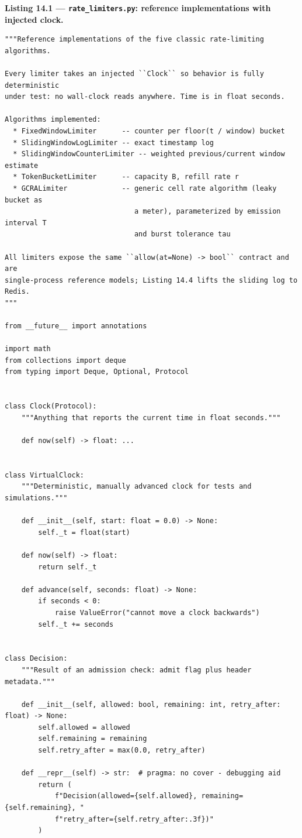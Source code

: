 \noindent\textbf{Listing 14.1 --- \texttt{rate\_limiters.py}: reference
implementations with injected clock.}
\label{lst:ch14-limiters}
\begin{verbatim}
"""Reference implementations of the five classic rate-limiting algorithms.

Every limiter takes an injected ``Clock`` so behavior is fully deterministic
under test: no wall-clock reads anywhere. Time is in float seconds.

Algorithms implemented:
  * FixedWindowLimiter      -- counter per floor(t / window) bucket
  * SlidingWindowLogLimiter -- exact timestamp log
  * SlidingWindowCounterLimiter -- weighted previous/current window estimate
  * TokenBucketLimiter      -- capacity B, refill rate r
  * GCRALimiter             -- generic cell rate algorithm (leaky bucket as
                               a meter), parameterized by emission interval T
                               and burst tolerance tau

All limiters expose the same ``allow(at=None) -> bool`` contract and are
single-process reference models; Listing 14.4 lifts the sliding log to Redis.
"""

from __future__ import annotations

import math
from collections import deque
from typing import Deque, Optional, Protocol


class Clock(Protocol):
    """Anything that reports the current time in float seconds."""

    def now(self) -> float: ...


class VirtualClock:
    """Deterministic, manually advanced clock for tests and simulations."""

    def __init__(self, start: float = 0.0) -> None:
        self._t = float(start)

    def now(self) -> float:
        return self._t

    def advance(self, seconds: float) -> None:
        if seconds < 0:
            raise ValueError("cannot move a clock backwards")
        self._t += seconds


class Decision:
    """Result of an admission check: admit flag plus header metadata."""

    def __init__(self, allowed: bool, remaining: int, retry_after: float) -> None:
        self.allowed = allowed
        self.remaining = remaining
        self.retry_after = max(0.0, retry_after)

    def __repr__(self) -> str:  # pragma: no cover - debugging aid
        return (
            f"Decision(allowed={self.allowed}, remaining={self.remaining}, "
            f"retry_after={self.retry_after:.3f})"
        )



\end{verbatim}
